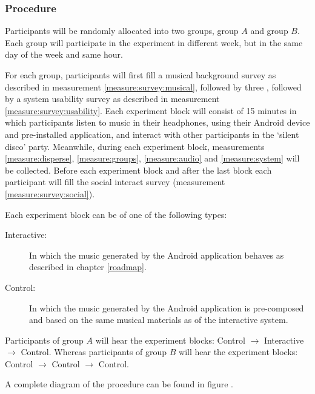 \subsubsection{Procedure}

Participants will be randomly allocated into two groups, group $A$ and group $B$\@. Each group will participate in the experiment in different week, but in the same day of the week and same hour.

For each group, participants will first fill a musical background survey as described in measurement \ref{measure:survey:musical}, followed by three , followed by a system usability survey as described in measurement \ref{measure:survey:usability}. Each experiment block will consist of 15 minutes in which participants listen to music in their headphones, using their Android device and pre-installed application, and interact with other participants in the `silent disco' party. Meanwhile, during each experiment block, measurements \ref{measure:disperse}, \ref{measure:groups}, \ref{measure:audio} and \ref{measure:system} will be collected. Before each experiment block and after the last block each participant will fill the social interact survey (measurement \ref{measure:survey:social}).

Each experiment block can be of one of the following types:
\begin{description}
	\item[Interactive:] In which the music generated by the Android application behaves as described in chapter \ref{roadmap}.
	\item[Control:] In which the music generated by the Android application is pre-composed and based on the same musical materials as of the interactive system.
\end{description}

Participants of group $A$ will hear the experiment blocks: Control $\rightarrow$ Interactive $\rightarrow$ Control. Whereas participants of group $B$ will hear the experiment blocks: Control $\rightarrow$ Control $\rightarrow$ Control.

A complete diagram of the procedure can be found in figure .